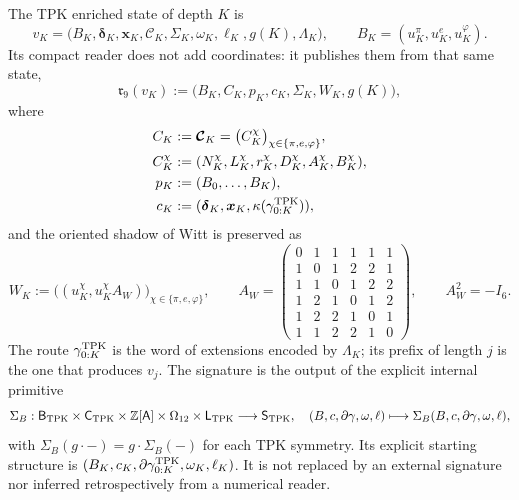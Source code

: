 \begin{definition}
\label{def:continuo-comun-lector-compacto-nonadico}
The TPK enriched state of depth \(K\) is
\begin{equation}
\label{eq:continuo-comun-estado-tpk-completo}
 v_K=
 \bigl(
 B_K,\boldsymbol\delta_K,\boldsymbol x_K,
 \boldsymbol{\mathcal C}_K,\Sigma_K,
 \omega_K,\ell_K,g(K),\Lambda_K
 \bigr),
 \qquad
 B_K=(u_K^\pi,u_K^e,u_K^\varphi).
\end{equation}
Its compact reader does not add coordinates: it publishes them from that same state,
\begin{equation}
\label{eq:continuo-comun-lector-compacto-nonadico}
 \mathfrak r_9(v_K)
 :=\bigl(B_K,C_K,p_K,c_K,\Sigma_K,W_K,g(K)\bigr),
\end{equation}
where
\begin{equation}
\label{eq:continuo-comun-lector-compacto-componentes}
\begin{aligned}
 C_K&:=\boldsymbol{\mathcal C}_K
      =\bigl(C_K^\chi\bigr)_{\chi\in\{\pi,e,\varphi\}},\\
 C_K^\chi&:=(N_K^\chi,L_K^\chi,r_K^\chi,
             D_K^\chi,A_K^\chi,B_K^\chi),\\
 p_K&:=(B_0,\ldots,B_K),\\
 c_K&:=(\boldsymbol\delta_K,\boldsymbol x_K,
       \kappa(\gamma^{\rm TPK}_{0:K})),
\end{aligned}
\end{equation}
and the oriented shadow of Witt is preserved as
\begin{equation}
\label{eq:continuo-comun-sombra-witt}
 W_K:=
 \bigl((u_K^\chi,u_K^\chi A_W)\bigr)_
       {\chi\in\{\pi,e,\varphi\}},
 \qquad
 A_W=
 \begin{pmatrix}
 0&1&1&1&1&1\\
 1&0&1&2&2&1\\
 1&1&0&1&2&2\\
 1&2&1&0&1&2\\
 1&2&2&1&0&1\\
 1&1&2&2&1&0
 \end{pmatrix},
 \qquad A_W^2=-I_6.
\end{equation}
The route \(\gamma^{\rm TPK}_{0:K}\) is the word of extensions encoded
by \(\Lambda_K\); its prefix of length \(j\) is the one that produces
\(v_j\). The signature is the output of the explicit internal primitive
\begin{equation}
\label{eq:continuo-comun-primitiva-firma-tpk}
 \Sigma_B:
 \mathsf B_{\rm TPK}\times\mathsf C_{\rm TPK}
 \times\mathbb Z[\mathsf A]\times\Omega_{12}\times\mathsf L_{\rm TPK}
 \longrightarrow\mathsf S_{\rm TPK},
 \quad
 (B,c,\partial\gamma,\omega,\ell)\longmapsto
 \Sigma_B(B,c,\partial\gamma,\omega,\ell),
\end{equation}
with \(\Sigma_B(g\cdot-)=g\cdot\Sigma_B(-)\) for each TPK symmetry. Its
explicit starting structure is
\((B_K,c_K,\partial\gamma^{\rm TPK}_{0:K},\omega_K,\ell_K)\). It is not replaced by an
external signature nor inferred retrospectively from a numerical reader.
\end{definition}

